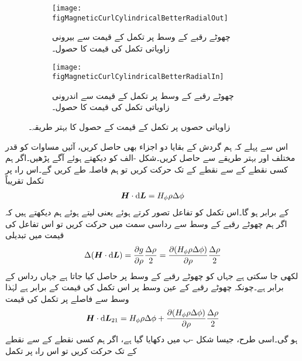 \begin{figure}
\centering
\begin{subfigure}{0.5\textwidth}
\centering
\texttt{[image: figMagneticCurlCylindricalBetterRadialOut]}
\caption{چھوٹے رقبے کے وسط پر تکمل کے قیمت سے بیرونی زاویاتی تکمل کی قیمت کا حصول۔}
\end{subfigure}%
%
\begin{subfigure}{0.5\textwidth}
\centering
\texttt{[image: figMagneticCurlCylindricalBetterRadialIn]}
\caption{چھوٹے رقبے کے وسط پر تکمل کے قیمت سے اندرونی زاویاتی تکمل کی قیمت کا حصول۔}
\end{subfigure}%
\caption{زاویاتی حصوں پر تکمل کے قیمت کے حصول کا بہتر طریقہ۔}
\label{شکل_مقناطیسی_بہتر_گردش_نلکی}
\end{figure}
اس سے پہلے کہ ہم گردش کے بقایا دو اجزاء بھی حاصل کریں، آئیں مساوات  کو قدر مختلف اور بہتر طریقے سے حاصل کریں۔شکل -الف کو دیکھتے ہوئے آگے پڑھیں۔اگر ہم کسی نقطے  کے   سے نقطے کے  تک حرکت کریں تو ہم   فاصلہ طے کریں گے۔اس راہ پر تکمل تقریباً
\begin{align*}
\kvec{H} \cdot \dif \kvec{L}=H_{\phi}\rho \Delta \phi
\end{align*}
 کے برابر ہو گا۔اس تکمل کو تفاعل  تصور کرتے ہوئے  یعنی  لیتے ہوئے  ہم دیکھتے ہیں کہ اگر ہم چھوٹے رقبے کے وسط سے رداسی سمت میں   حرکت کریں تو اس تفاعل کی قیمت میں تبدیلی
\begin{align*}
\Delta (\kvec{H} \cdot \dif \kvec{L})=\frac{\partial g}{\partial \rho}\frac{\Delta \rho}{2}=\frac{\partial (H_{\phi}\rho \Delta \phi)}{\partial \rho} \frac{\Delta \rho}{2}
\end{align*}
لکھی جا سکتی ہے جہاں  کو چھوٹے رقبے کے وسط پر حاصل کیا جاتا ہے جہاں رداس  کے برابر ہے۔چونکہ چھوٹے رقبے کے عین وسط پر اس تکمل کی قیمت  کے برابر ہے لہٰذا وسط سے  فاصلے پر تکمل کی قیمت
\begin{align}\label{مساوات_مقناطیسی_نلکی_ایک_دو}
\kvec{H} \cdot \dif \kvec{L}_{21}=H_{\phi}\rho \Delta \phi+\frac{\partial (H_{\phi}\rho \Delta \phi)}{\partial \rho} \frac{\Delta \rho}{2}
\end{align}
ہو گی۔اسی طرح، جیسا شکل -ب میں دکھایا گیا ہے، اگر ہم کسی نقطے کے   سے نقطے کے   تک حرکت کریں تو اس راہ پر تکمل
